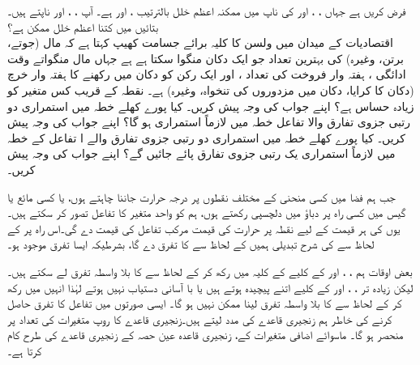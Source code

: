 فرض کریں  ہے جہاں ، ،  اور  کی ناپ میں ممکنہ اعظم خلل  بالترتیب  ،  اور   ہے۔ آپ ، ،  اور  ناپتے ہیں۔ بتائیں   میں کتنا   اعظم خلل ممکن ہے؟
\\
اقتصادیات کے  میدان میں ولسن کا کلیہ برائے جسامت کھیپ  کہتا ہے کہ   مال   (جوتے، برتن، وغیرہ)  کی بہترین  تعداد     جو ایک دکان  منگوا  سکتا ہے    ہے  جہاں  مال منگواتے وقت ادائگی   ، ہفتہ وار فروخت کی تعداد  ،  اور ایک رکن  کو دکان میں رکھنے کا ہفتہ وار خرچ (دکان کا کرایا، دکان میں مزدوروں کی تنخواہ، وغیرہ)  ہے۔ نقطہ   کے قریب  کس متغیر کو زیادہ حساس ہے؟ اپنے جواب کی وجہ پیش کریں۔
کیا پورے  کھلے خطہ  میں استمراری دو رتبی جزوی تفارق والا   تفاعل  خطہ  میں لازماً استمراری ہو گا؟ اپنے جواب کی وجہ پیش کریں۔
کیا پورے کھلے  خطہ  میں استمراری دو رتبی جزوی تفارق والے ا   تفاعل کے  خطہ  میں لازماً استمراری یک رتبی جزوی تفارق پائے جائیں گے؟ اپنے جواب کی وجہ پیش کریں۔


جب ہم  فضا میں کسی   منحنی   کے مختلف نقطوں پر درجہ حرارت  جاننا چاہتے ہوں، یا   کسی مائع  یا گیس میں   کسی راہ پر دباؤ میں دلچسپی رکھتے ہوں،  ہم  کو واحد متغیر  کا تفاعل تصور کر سکتے ہیں۔ یوں  کی ہر قیمت کے لیے نقطہ  پر    حرارت کی قیمت  مرکب تفاعل  کی قیمت دے گی۔اس راہ پر  کے لحاظ سے  کی شرح تبدیلی  ہمیں  کے لحاظ سے   کا تفرق دے گا، بشرطیکہ ایسا تفرق موجود ہو۔

بعض اوقات ہم ، ،  اور  کے کلیے  کے کلیہ میں رکھ  کر   کے لحاظ سے  کا  بلا واسطہ تفرق لے سکتے ہیں۔لیکن زیادہ  تر  ،  ، اور  کے کلیے  اتنے  پیچیدہ ہوتے ہیں یا   با آسانی دستیاب نہیں ہوتے   لہٰذا   انہیں  میں رکھ  کر   کے لحاظ سے  کا بلا واسطہ  تفرق لینا ممکن  نہیں ہو گا۔ ایسی صورتوں میں تفاعل کا تفرق حاصل کرنے کی خاطر ہم زنجیری قاعدے کی مدد لیتے ہیں۔زنجیری قاعدے  کا روپ متغیرات کی تعداد پر منحصر ہو گا۔ ماسوائے اضافی متغیرات کے،  زنجیری قاعدہ عین حصہ  کے زنجیری قاعدے  کی طرح کام کرتا ہے۔

